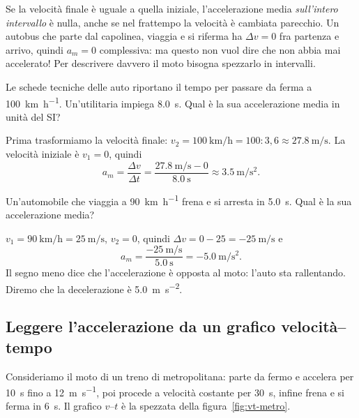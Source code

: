 \begin{remark}
Se la velocità finale è uguale a quella iniziale, l'accelerazione media \emph{sull'intero intervallo} è nulla, anche se nel frattempo la velocità è cambiata parecchio. Un autobus che parte dal capolinea, viaggia e si riferma ha $\Delta v = 0$ fra partenza e arrivo, quindi $a_m = 0$ complessiva: ma questo non vuol dire che non abbia mai accelerato! Per descrivere davvero il moto bisogna spezzarlo in intervalli.
\end{remark}

\begin{testexample}
Le schede tecniche delle auto riportano il tempo per passare da ferma a \SI{100}{\kilo\metre\per\hour}. Un'utilitaria impiega \SI{8,0}{\second}. Qual è la sua accelerazione media in unità del SI?

Prima trasformiamo la velocità finale: $v_2 = \SI{100}{\kilo\metre\per\hour} = 100 : 3{,}6 \approx \SI{27,8}{\metre\per\second}$. La velocità iniziale è $v_1 = 0$, quindi
\[ a_m = \frac{\Delta v}{\Delta t} = \frac{\SI{27,8}{\metre\per\second} - 0}{\SI{8,0}{\second}} \approx \SI{3,5}{\metre\per\second\squared}. \]
\end{testexample}

\begin{testexample}
Un'automobile che viaggia a \SI{90}{\kilo\metre\per\hour} frena e si arresta in \SI{5,0}{\second}. Qual è la sua accelerazione media?

$v_1 = \SI{90}{\kilo\metre\per\hour} = \SI{25}{\metre\per\second}$, $v_2 = 0$, quindi $\Delta v = 0 - 25 = \SI{-25}{\metre\per\second}$ e
\[ a_m = \frac{\SI{-25}{\metre\per\second}}{\SI{5,0}{\second}} = \SI{-5,0}{\metre\per\second\squared}. \]
Il segno meno dice che l'accelerazione è opposta al moto: l'auto sta rallentando. Diremo che la decelerazione è \SI{5,0}{\metre\per\second\squared}.
\end{testexample}

\subsection{Leggere l'accelerazione da un grafico velocità--tempo}
Consideriamo il moto di un treno di metropolitana: parte da fermo e accelera per \SI{10}{\second} fino a \SI{12}{\metre\per\second}, poi procede a velocità costante per \SI{30}{\second}, infine frena e si ferma in \SI{6}{\second}. Il grafico $v$--$t$ è la spezzata della figura~\ref{fig:vt-metro}.

